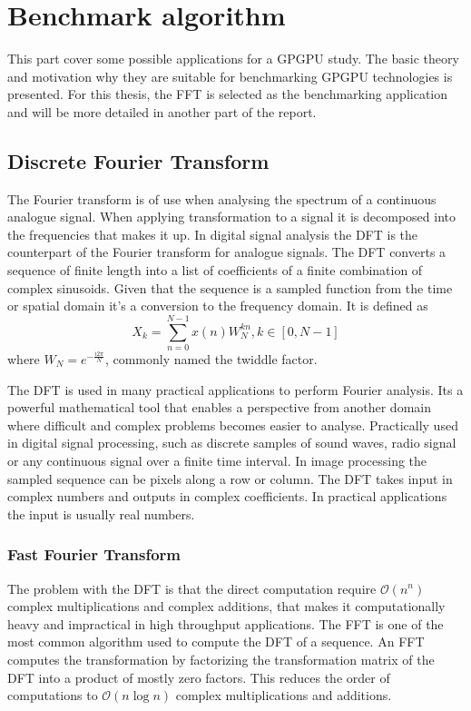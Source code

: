 \chapter{Benchmark algorithm}\label{cha:algorithms}
This part cover some possible applications for a \gls{GPGPU} study. The basic theory and motivation why they are suitable for benchmarking \gls{GPGPU} technologies is presented. For this thesis, the \gls{FFT} is selected as the benchmarking application and will be more detailed in another part of the report.

\section{Discrete Fourier Transform}
The Fourier transform is of use when analysing the spectrum of a continuous analogue signal. When applying transformation to a signal it is decomposed into the frequencies that makes it up. In digital signal analysis the \gls{DFT} is the counterpart of the Fourier transform for analogue signals. The \gls{DFT} converts a sequence of finite length into a list of coefficients of a finite combination of complex sinusoids. Given that the sequence is a sampled function from the time or spatial domain it's a conversion to the frequency domain. It is defined as
\begin{equation}
	X_k=\sum_{n=0}^{N-1}x(n)W_N^{kn}, k \in {[0, N-1]}	
\end{equation}
where $W_N=e^{-\frac{i2{\pi}}{N}}$, commonly named the twiddle factor\cite{gentleman1966fast}.

The \gls{DFT} is used in many practical applications to perform Fourier analysis. Its a powerful mathematical tool that enables a perspective from another domain where difficult and complex problems becomes easier to analyse. Practically used in digital signal processing, such as discrete samples of sound waves, radio signal or any continuous signal over a finite time interval. In image processing the sampled sequence can be pixels along a row or column. The \gls{DFT} takes input in complex numbers and outputs in complex coefficients. In practical applications the input is usually real numbers.

\subsection{Fast Fourier Transform}\label{sec:algorithms:fft}
The problem with the \gls{DFT} is that the direct computation require $\mathcal{O}(n^n)$ complex multiplications and complex additions, that makes it computationally heavy and impractical in high throughput applications. The \gls{FFT} is one of the most common algorithm used to compute the \gls{DFT} of a sequence. An \gls{FFT} computes the transformation by factorizing the transformation matrix of the \gls{DFT} into a product of mostly zero factors. This reduces the order of computations to $\mathcal{O}(n\log{}n)$ complex multiplications and additions.

